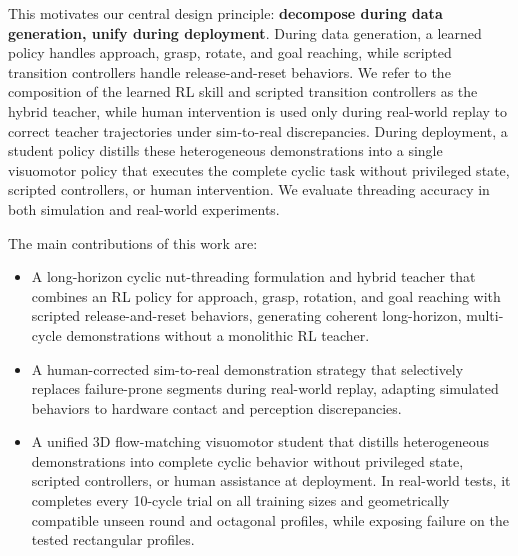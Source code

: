 This motivates our central design principle: \textbf{decompose during data
generation, unify during deployment}. During data generation, a learned policy handles
approach, grasp, rotate, and goal reaching, while scripted transition
controllers handle release-and-reset behaviors. We refer to the
composition of the learned RL skill and scripted transition controllers as the
hybrid teacher, while human intervention is used only during real-world replay
to correct teacher trajectories under sim-to-real discrepancies. During
deployment, a student policy distills these heterogeneous demonstrations into
a single visuomotor policy that executes the complete cyclic task without
privileged state, scripted controllers, or human intervention. We evaluate
threading accuracy in both simulation and real-world experiments.

The main contributions of this work are:
\begin{itemize}
  \item A long-horizon cyclic nut-threading formulation and hybrid teacher that
    combines an RL policy for approach, grasp, rotation, and
    goal reaching with scripted release-and-reset behaviors, generating coherent
    long-horizon, multi-cycle demonstrations without a monolithic RL teacher.

  \item A human-corrected sim-to-real demonstration strategy that selectively
    replaces failure-prone segments during real-world replay, adapting
    simulated behaviors to hardware contact and perception discrepancies.

  \item A unified 3D flow-matching visuomotor student that distills
    heterogeneous demonstrations into complete cyclic behavior without
    privileged state, scripted controllers, or human assistance at deployment.
    In real-world tests, it completes every 10-cycle trial on all training
    sizes and geometrically compatible unseen round and octagonal profiles,
    while exposing failure on the tested rectangular profiles.
\end{itemize}
